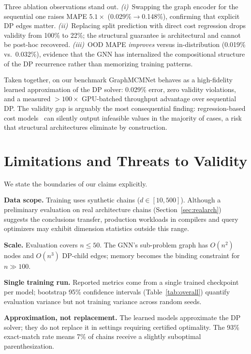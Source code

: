 \documentclass[conference]{IEEEtran}
\begin{document}
Three ablation observations stand out. \emph{(i)}~Swapping the graph encoder for
the sequential one raises MAPE $5.1{\times}$ (0.029\%$\to$0.148\%), confirming
that explicit DP edges matter. \emph{(ii)}~Replacing split prediction with direct
cost regression drops validity from 100\% to 22\%; the structural guarantee is
architectural and cannot be post-hoc recovered. \emph{(iii)}~OOD MAPE
\emph{improves} versus in-distribution (0.019\% vs.\ 0.032\%), evidence that the
GNN has internalized the compositional structure of the DP recurrence rather than
memorizing training patterns.

Taken together, on our benchmark GraphMCMNet behaves as a high-fidelity learned
approximation of the DP solver: 0.029\% error, zero validity violations, and a
measured ${>}100{\times}$ GPU-batched throughput advantage over sequential DP.
The validity gap is arguably the most consequential finding: regression-based cost
models~\cite{b17,b19} can silently output infeasible values in the majority of
cases, a risk that structural architectures eliminate by construction.

\section{Limitations and Threats to Validity}
\label{sec:limitations}

We state the boundaries of our claims explicitly.

\noindent\textbf{Data scope.} Training uses synthetic chains
($d{\in}[10,500]$). Although a preliminary evaluation on real architecture
chains (Section~\ref{sec:realarch}) suggests the conclusions transfer,
production workloads in compilers and query optimizers may exhibit dimension
statistics outside this range.

\noindent\textbf{Scale.} Evaluation covers $n{\le}50$. The GNN's sub-problem
graph has $O(n^2)$ nodes and $O(n^3)$ DP-child edges; memory becomes the
binding constraint for $n{\gg}100$.

\noindent\textbf{Single training run.} Reported metrics come from a single trained
checkpoint per model; bootstrap 95\% confidence intervals
(Table~\ref{tab:overall}) quantify evaluation variance but not training
variance across random seeds.

\noindent\textbf{Approximation, not replacement.} The learned models approximate
the DP solver; they do not replace it in settings requiring certified optimality.
The 93\% exact-match rate means 7\% of chains receive a slightly suboptimal
parenthesization.
\end{document}
